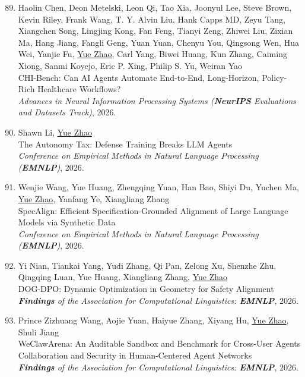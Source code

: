 \documentclass[margin,line,pifont,palatino,courier]{res}
\newenvironment{benumerate}[1]{
    \let\oldItem\item
    \def\item{\addtocounter{enumi}{-2}\oldItem}
    \begin{enumerate}[leftmargin=0.25in,label=\textcolor{uscred}{\arabic*.}]
    \setcounter{enumi}{#1}
    \addtocounter{enumi}{1}
}{
    \end{enumerate}
}
\begin{document}
\begin{resume}
\begin{benumerate}{88}
    \item
    Haolin Chen, Deon Metelski, Leon Qi, Tao Xia, Joonyul Lee, Steve Brown, Kevin Riley, Frank Wang, T. Y. Alvin Liu, Hank Capps MD, Zeyu Tang, Xiangchen Song, Lingjing Kong, Fan Feng, Tianyi Zeng, Zhiwei Liu, Zixian Ma, Hang Jiang, Fangli Geng, Yuan Yuan, Chenyu You, Qingsong Wen, Hua Wei, Yanjie Fu, \underline{Yue Zhao}, Carl Yang, Biwei Huang, Kun Zhang, Caiming Xiong, Sanmi Koyejo, Eric P. Xing, Philip S. Yu, Weiran Yao\\
    CHI-Bench: Can AI Agents Automate End-to-End, Long-Horizon, Policy-Rich Healthcare Workflows?\\
    \textit{Advances in Neural Information Processing Systems (\textbf{NeurIPS} Evaluations and Datasets Track)}, 2026.

    \item
    Shawn Li, \underline{Yue Zhao}\\
    The Autonomy Tax: Defense Training Breaks LLM Agents\\
    \textit{Conference on Empirical Methods in Natural Language Processing (\textbf{EMNLP})}, 2026.

    \item
    Wenjie Wang, Yue Huang, Zhengqing Yuan, Han Bao, Shiyi Du, Yuchen Ma, \underline{Yue Zhao}, Yanfang Ye, Xiangliang Zhang\\
    SpecAlign: Efficient Specification-Grounded Alignment of Large Language Models via Synthetic Data\\
    \textit{Conference on Empirical Methods in Natural Language Processing (\textbf{EMNLP})}, 2026.

    \item
    Yi Nian, Tiankai Yang, Yudi Zhang, Qi Pan, Zelong Xu, Shenzhe Zhu, Qingqing Luan, Yue Huang, Xiangliang Zhang, \underline{Yue Zhao}\\
    DOG-DPO: Dynamic Optimization in Geometry for Safety Alignment\\
    \textit{\textbf{Findings} of the Association for Computational Linguistics: \textbf{EMNLP}}, 2026.

    \item
    Prince Zizhuang Wang, Aojie Yuan, Haiyue Zhang, Xiyang Hu, \underline{Yue Zhao}, Shuli Jiang\\
    WeClawArena: An Auditable Sandbox and Benchmark for Cross-User Agents Collaboration and Security in Human-Centered Agent Networks\\
    \textit{\textbf{Findings} of the Association for Computational Linguistics: \textbf{EMNLP}}, 2026.


\end{benumerate}
\end{resume}
\end{document}
